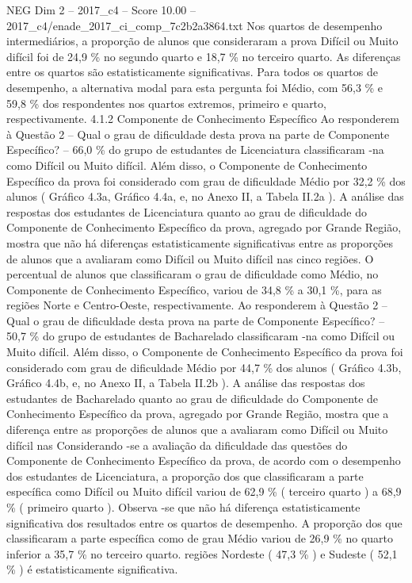 \begin{textsample}{NEG Dim 2 – 2017\_c4 – Score 10.00 – 2017\_c4/enade\_2017\_ci\_comp\_7c2b2a3864.txt}
Nos quartos de desempenho intermediários, a proporção de alunos que consideraram a prova Difícil ou Muito difícil foi de 24,9 \% no segundo quarto e 18,7 \% no terceiro quarto.
As diferenças entre os quartos são estatisticamente significativas.
Para todos os quartos de desempenho, a alternativa modal para esta pergunta foi Médio, com 56,3 \% e 59,8 \% dos respondentes nos quartos extremos, primeiro e quarto, respectivamente. 4.1.2 Componente de Conhecimento Específico Ao responderem à Questão 2 – Qual o grau de dificuldade desta prova na parte de Componente Específico? – 66,0 \% do grupo de estudantes de Licenciatura classificaram -na como Difícil ou Muito difícil.
Além disso, o Componente de Conhecimento Específico da prova foi considerado com grau de dificuldade Médio por 32,2 \% dos alunos ( Gráfico 4.3a, Gráfico 4.4a, e, no Anexo II, a Tabela II.2a ).
A análise das respostas dos estudantes de Licenciatura quanto ao grau de dificuldade do Componente de Conhecimento Específico da prova, agregado por Grande Região, mostra que não há diferenças estatisticamente significativas entre as proporções de alunos que a avaliaram como Difícil ou Muito difícil nas cinco regiões.
O percentual de alunos que classificaram o grau de dificuldade como Médio, no Componente de Conhecimento Específico, variou de 34,8 \% a 30,1 \%, para as regiões Norte e Centro-Oeste, respectivamente.
Ao responderem à Questão 2 – Qual o grau de dificuldade desta prova na parte de Componente Específico? – 50,7 \% do grupo de estudantes de Bacharelado classificaram -na como Difícil ou Muito difícil.
Além disso, o Componente de Conhecimento Específico da prova foi considerado com grau de dificuldade Médio por 44,7 \% dos alunos ( Gráfico 4.3b, Gráfico 4.4b, e, no Anexo II, a Tabela II.2b ).
A análise das respostas dos estudantes de Bacharelado quanto ao grau de dificuldade do Componente de Conhecimento Específico da prova, agregado por Grande Região, mostra que a diferença entre as proporções de alunos que a avaliaram como Difícil ou Muito difícil nas Considerando -se a avaliação da dificuldade das questões do Componente de Conhecimento Específico da prova, de acordo com o desempenho dos estudantes de Licenciatura, a proporção dos que classificaram a parte específica como Difícil ou Muito difícil variou de 62,9 \% ( terceiro quarto ) a 68,9 \% ( primeiro quarto ).
Observa -se que não há diferença estatisticamente significativa dos resultados entre os quartos de desempenho.
A proporção dos que classificaram a parte específica como de grau Médio variou de 26,9 \% no quarto inferior a 35,7 \% no terceiro quarto. regiões Nordeste ( 47,3 \% ) e Sudeste ( 52,1 \% ) é estatisticamente significativa.

\end{textsample}
